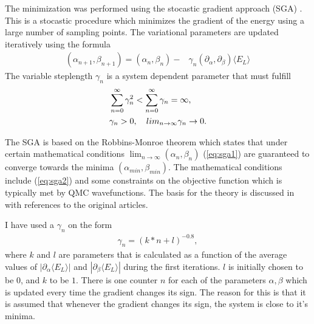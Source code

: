 \documentclass[a4paper,10pt,twocolumn]{article} %
\newcommand{\expec}[1]{\langle{}{#1}\rangle{}}
\begin{document}
The minimization was performed using the stocastic gradient approach (SGA) \cite{harju_1997,harju_2005,nissenbaum_2008}. 
This is a stocastic procedure which minimizes the gradient of the energy using a large number of sampling points.
The variational parameters are updated iteratively using the formula
\begin{align}
	(\alpha_{n+1},\beta_{n+1})=	(\alpha_{n},\beta_{n}) -
	&\gamma_n\left({\partial_\alpha},{\partial_\beta}\right) \expec{E_L}\label{eq:sga1}
\end{align}
The variable steplength $\gamma_n$ is a system dependent parameter that must fulfill
\begin{align}
&	\sum_{n=0}^\infty \gamma_n^2 <
	\sum_{n=0}^\infty \gamma_n = \infty,\notag\\
    &\gamma_n>0,\quad
	lim_{n\to\infty}\gamma_n\to0.\label{eq:sga2}
\end{align}

The SGA is based on the Robbins-Monroe theorem which states that under certain mathematical conditions $\lim_{n\to\infty}(\alpha_n,\beta_n)$ (\ref{eq:sga1})
are guaranteed to converge towards the minima $(\alpha_{min},\beta_{min})$. The mathematical conditions include (\ref{eq:sga2}) and some constraints on the
objective function which is typically met by QMC wavefunctions.
The basis for the theory is discussed in \cite{nissenbaum_2008} with references to the original articles. 

I have used a $\gamma_n$ on the form
\begin{align}
	\gamma_n=(k * n + l )^{-0.8},
\end{align}
where $k$ and $l$ are parameters that is calculated as a function of the average values of $|\partial_\alpha\expec{E_L}|$ and $|\partial_\beta\expec{E_L}|$ during the first iterations.
$l$ is initially chosen to be $0$, and $k$ to be $1$.
There is one counter $n$ for each of the parameters $\alpha,\beta$ which is updated every time the gradient changes its sign. The reason for this is that it 
is assumed that whenever the gradient changes its sign, the system is close to it's minima\cite{harju_2005}. 
\end{document}
